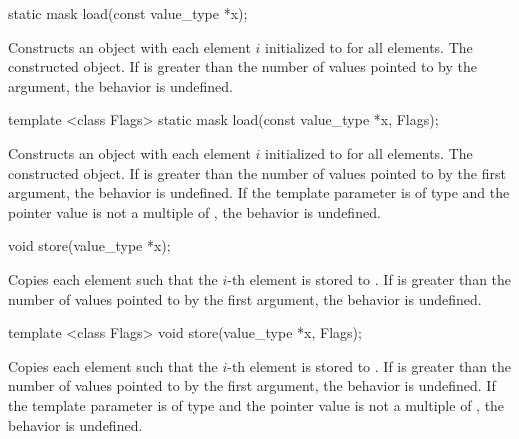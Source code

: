 \begin{itemdecl}
static mask load(const value_type *x);
\end{itemdecl}
\begin{itemdescr}
  \pnum \effects Constructs an object with each element $i$ initialized to  for all elements.
  \pnum \returns The constructed object.
  \pnum \remarks If \mask{} is greater than the number of values pointed to by the argument, the behavior is undefined.
\end{itemdescr}

\begin{itemdecl}
template <class Flags> static mask load(const value_type *x, Flags);
\end{itemdecl}
\begin{itemdescr}
  \pnum\effects Constructs an object with each element $i$ initialized to  for all elements.
  \pnum\returns The constructed object.
  \pnum\remarks If \mask{} is greater than the number of values pointed to by the first argument, the behavior is undefined.
  \pnum\remarks If the template parameter is of type  and the pointer value is not a multiple of , the behavior is undefined.
\end{itemdescr}

\begin{itemdecl}
void store(value_type *x);
\end{itemdecl}
\begin{itemdescr}
  \pnum\effects Copies each element such that the $i$-th element is stored to .
  \pnum\remarks If \mask{} is greater than the number of values pointed to by the first argument, the behavior is undefined.
\end{itemdescr}

\begin{itemdecl}
template <class Flags> void store(value_type *x, Flags);
\end{itemdecl}
\begin{itemdescr}
  \pnum\effects Copies each element such that the $i$-th element is stored to .
  \pnum\remarks If \mask{} is greater than the number of values pointed to by the first argument, the behavior is undefined.
  \pnum\remarks If the template parameter is of type  and the pointer value is not a multiple of , the behavior is undefined.
\end{itemdescr}

